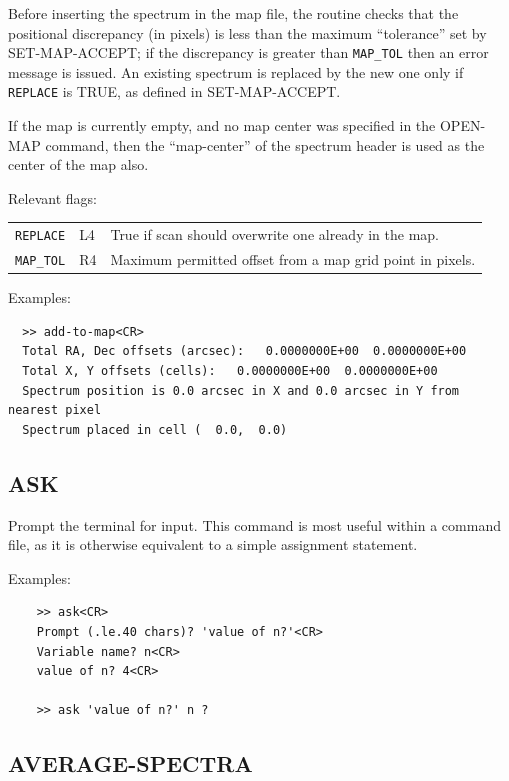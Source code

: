 \documentclass[11pt,twoside]{report}
\begin{document}
Before inserting the spectrum in the map file, the routine checks that the
positional discrepancy (in pixels) is less than the maximum ``tolerance''
set by SET-MAP-ACCEPT; if the discrepancy is greater than \verb+MAP_TOL+
then an error message is issued. An existing spectrum is replaced by the
new one only if \verb+REPLACE+ is TRUE, as defined in SET-MAP-ACCEPT.

If the map is currently empty, and no map center was specified in the
OPEN-MAP command, then the ``map-center'' of the spectrum header is used
as the center of the map also.

Relevant flags:\\
\begin{tabular}{lll}\index{REPLACE@\verb+REPLACE+}\index{MAP_TOL@\verb+MAP_TOL+}
  \verb+REPLACE+ &  L4 & True if scan should overwrite one already in
                            the map. \\
  \verb+MAP_TOL+ &  R4 & Maximum permitted offset from a map grid point
                            in pixels.
\end{tabular}

Examples:
\begin{verbatim}
  >> add-to-map<CR>
  Total RA, Dec offsets (arcsec):   0.0000000E+00  0.0000000E+00
  Total X, Y offsets (cells):   0.0000000E+00  0.0000000E+00
  Spectrum position is 0.0 arcsec in X and 0.0 arcsec in Y from nearest pixel
  Spectrum placed in cell (  0.0,  0.0)

\end{verbatim}

\subsection{ASK}  

Prompt the terminal for input. This command is most useful within a command
file, as it is otherwise equivalent to a simple assignment statement.

Examples:
\begin{verbatim}
    >> ask<CR>
    Prompt (.le.40 chars)? 'value of n?'<CR>
    Variable name? n<CR>
    value of n? 4<CR>

    >> ask 'value of n?' n ?
\end{verbatim}

\subsection{AVERAGE-SPECTRA}
\end{document}
